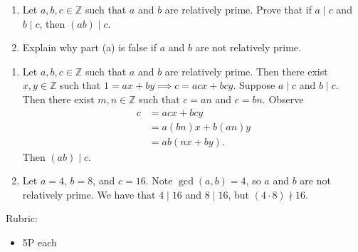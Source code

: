 \documentclass{article}
\newcommand{\Z}{\mathbb{Z}}
\theoremstyle{definition}
\begin{document}
\begin{question}
    \begin{enumerate}
        \item Let $a, b, c\in \Z$ such that $a$ and $b$ are relatively prime. Prove that if $a\mid c$ and $b\mid c$, then $(ab)\mid c$.
        \item Explain why part (a) is false if $a$ and $b$ are not relatively prime.
    \end{enumerate}
\end{question}
\begin{solution}
\begin{enumerate}
    \item Let $a, b, c\in \Z$ such that $a$ and $b$ are relatively prime. Then there exist $x, y\in \Z$ such that $1=ax+by \implies c = acx+bcy$. Suppose $a\mid c$ and $b\mid c$. Then there exist $m, n\in \Z$ such that $c=an$ and $c=bn$. Observe
    \begin{align*}
    c &= acx+bcy \\
    & = a(bn)x+b(an)y\\
    & = ab(nx+by).
    \end{align*}
    Then $(ab)\mid c$.
    \item Let $a=4$, $b=8$, and $c=16$. Note $\gcd(a, b)=4$, so $a$ and $b$ are not relatively prime. We have that $4\mid 16$ and $8\mid 16$, but $(4\cdot 8)\nmid 16$.

\end{enumerate}

{\color{red} Rubric:
\begin{itemize}
\item 5P each
\end{itemize}}
\end{solution}
\end{document}
